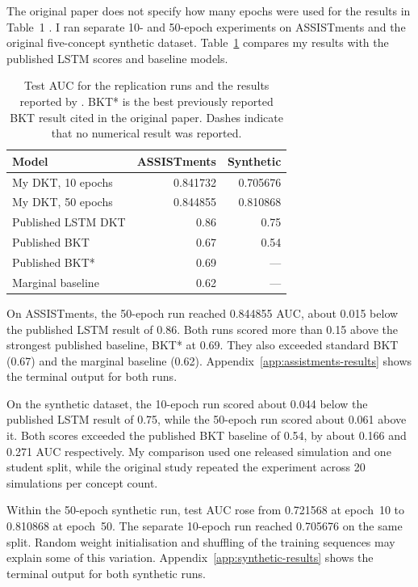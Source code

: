 \documentclass[11pt]{article}
\begin{document}
The original paper does not specify how many epochs were used for
the results in Table~1 \citep{piech2015deep}. I ran separate 10- and
50-epoch experiments on ASSISTments and the original five-concept
synthetic dataset. Table~\ref{tab:replication-auc} compares my results
with the published LSTM scores and baseline models.

\begin{table}[H]
\centering
\small
\begin{tabular}{@{}lrr@{}}
\hline
Model & ASSISTments & Synthetic \\
\hline
My DKT, 10 epochs   & 0.841732 & 0.705676 \\
My DKT, 50 epochs   & 0.844855 & 0.810868 \\
Published LSTM DKT  & 0.86 & 0.75 \\
Published BKT       & 0.67 & 0.54 \\
Published BKT*      & 0.69 & --- \\
Marginal baseline   & 0.62 & --- \\
\hline
\end{tabular}
\caption{Test AUC for the replication runs and the results reported
by \citet{piech2015deep}. BKT* is the best previously reported BKT
result cited in the original paper. Dashes indicate that no
numerical result was reported.}
\label{tab:replication-auc}
\end{table}

On ASSISTments, the 50-epoch run reached 0.844855 AUC, about 0.015
below the published LSTM result of 0.86. Both runs scored more than
0.15 above the strongest published baseline, BKT* at 0.69. They also
exceeded standard BKT (0.67) and the marginal baseline (0.62).
Appendix~\ref{app:assistments-results} shows the terminal output
for both runs.

On the synthetic dataset, the 10-epoch run scored about 0.044 below
the published LSTM result of 0.75, while the 50-epoch run scored
about 0.061 above it. Both scores exceeded the published BKT baseline
of 0.54, by about 0.166 and 0.271 AUC respectively. My comparison used
one released simulation and one student split, while the original
study repeated the experiment across 20 simulations per concept count.

Within the 50-epoch synthetic run, test AUC rose from 0.721568 at
epoch~10 to 0.810868 at epoch~50. The separate 10-epoch run reached
0.705676 on the same split. Random weight initialisation and shuffling
of the training sequences may explain some of this variation.
Appendix~\ref{app:synthetic-results} shows the terminal output for
both synthetic runs.
\end{document}
